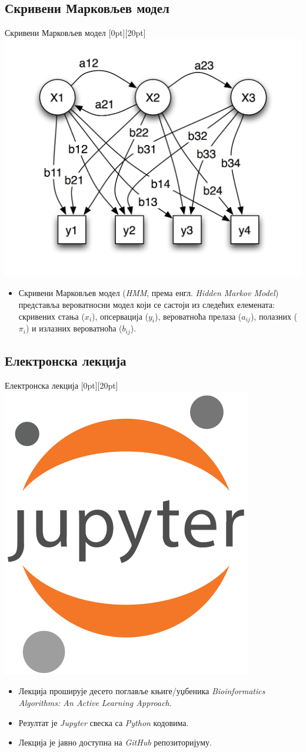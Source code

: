 \documentclass[hyperref={bookmarks=false}]{beamer}
\newcommand{\lenitem}[2][.43\linewidth]{\parbox[t]{#1}{\strut #2\strut}}
\begin{document}
\subsection{Скривени Марковљев модел}
\begin{frame}{Скривени Марковљев модел}
\mbox{}\hfill\raisebox{-\height}[0pt][20pt]{\includegraphics[width=.5\linewidth]{hmm.png}}
\vspace*{-\baselineskip}

\begin{itemize}
\item \lenitem{Скривени Марковљев модел (\textit{HMM}, према енгл. \textit{Hidden Markov Model}) представља вероватносни модел који се састоји из следећих елемената: скривених стања ($x_i$), опсервација ($y_i$), вероватноћа прелаза ($a_{ij}$), полазних ($\pi_i$) и излазних вероватноћа ($b_{ij}$).}
\end{itemize}
\end{frame}

\subsection{Електронска лекција}
\begin{frame}{Електронска лекција}
\mbox{}\hfill\raisebox{-\height}[0pt][20pt]{\includegraphics[width=.35\linewidth]{jupyter.png}}
\vspace*{-\baselineskip}

\begin{itemize}
\item \lenitem{Лекција проширује десето поглавље књиге/уџбеника \textit{Bioinformatics Algorithms: An Active Learning Approach}.}
\item \lenitem{Резултат је \textit{Jupyter} свеска са \textit{Python} кодовима.}
\item \lenitem{Лекција је јавно доступна на \textit{GitHub} репозиторијуму.}
\end{itemize}
\end{frame}
\end{document}

